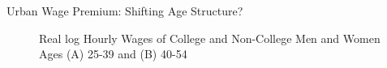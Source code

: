 \documentclass{beamer}
\begin{document}
\begin{frame}{Urban Wage Premium: Shifting Age Structure?}

\begin{figure}
\begin{minipage}{.5\linewidth}
	\centering
\end{minipage}%
\begin{minipage}{.5\linewidth}
	\centering
\end{minipage}
\centering
{}
	\caption{Real log Hourly Wages of College and Non-College Men and Women Ages (A) 25-39 and (B) 40-54}
\end{figure}

\end{frame}
\end{document}
